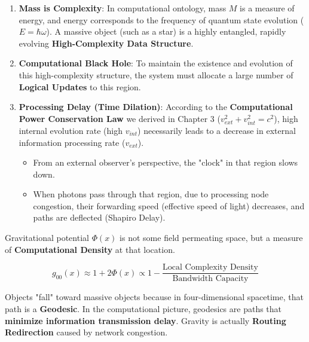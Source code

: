 \begin{enumerate}
\item \textbf{Mass is Complexity}: In computational ontology, mass $M$ is a measure of energy, and energy corresponds to the frequency of quantum state evolution ($E = \hbar \omega$). A massive object (such as a star) is a highly entangled, rapidly evolving \textbf{High-Complexity Data Structure}.

\item \textbf{Computational Black Hole}: To maintain the existence and evolution of this high-complexity structure, the system must allocate a large number of \textbf{Logical Updates} to this region.

\item \textbf{Processing Delay (Time Dilation)}: According to the \textbf{Computational Power Conservation Law} we derived in Chapter 3 ($v_{ext}^2 + v_{int}^2 = c^2$), high internal evolution rate (high $v_{int}$) necessarily leads to a decrease in external information processing rate ($v_{ext}$).

\begin{itemize}
\item From an external observer's perspective, the "clock" in that region slows down.

\item When photons pass through that region, due to processing node congestion, their forwarding speed (effective speed of light) decreases, and paths are deflected (Shapiro Delay).
\end{itemize}
\end{enumerate}

\begin{corollary}
Gravitational potential $\Phi(x)$ is not some field permeating space, but a measure of \textbf{Computational Density} at that location.

\begin{equation}
g_{00}(x) \approx 1 + 2\Phi(x) \propto 1 - \frac{\text{Local Complexity Density}}{\text{Bandwidth Capacity}}
\end{equation}
\end{corollary}

Objects "fall" toward massive objects because in four-dimensional spacetime, that path is a \textbf{Geodesic}. In the computational picture, geodesics are paths that \textbf{minimize information transmission delay}. Gravity is actually \textbf{Routing Redirection} caused by network congestion.

